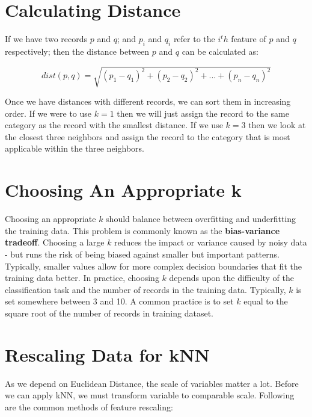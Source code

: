 \documentclass[11pt, letterpaper, twoside]{memoir}\usepackage{knitr}
\begin{document}
\section{Calculating Distance}

If we have two records $p$ and $q$; and $p_i$ and $q_i$ refer to the $i^th$ feature of $p$ and $q$ respectively; then the distance between $p$ and $q$ can be calculated as:

\[ dist(p, q) = \sqrt{(p_1 - q_1)^2 + (p_2 - q_2)^2 + ... + (p_n - q_n)^2} \]

Once we have distances with different records, we can sort them in increasing order. If we were to use $k = 1$ then we will just assign the record to the same category as the record with the smallest distance. If we use $k = 3$ then we look at the closest three neighbors and assign the record to the category that is most applicable within the three neighbors. 

\section{Choosing An Appropriate k}

Choosing an appropriate $k$ should balance between overfitting and underfitting the training data. This problem is commonly known as the \textbf{bias-variance tradeoff}. Choosing a large $k$ reduces the impact or variance caused by noisy data - but runs the risk of being biased against smaller but important patterns. Typically, smaller values allow for more complex decision boundaries that fit the training data better. In practice, choosing $k$ depends upon the difficulty of the classification task and the number of records in the training data. Typically, $k$ is set somewhere between 3 and 10. A common practice is to set $k$ equal to the square root of the number of records in training dataset.

\section{Rescaling Data for kNN}

As we depend on Euclidean Distance, the scale of variables matter a lot. Before we can apply kNN, we must transform variable to comparable scale. Following are the common methods of feature rescaling:
\end{document}
